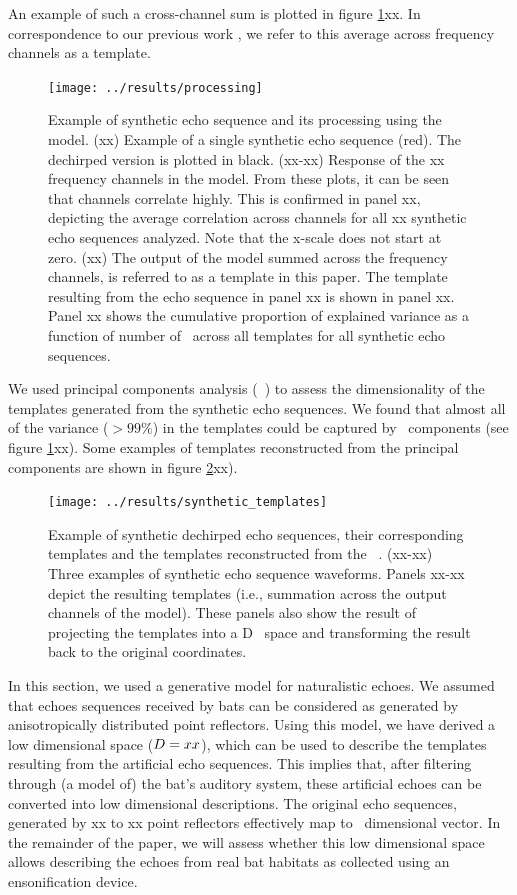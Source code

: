 \documentclass[preprint,5p]{elsarticle}
\begin{document}
An example of such a cross-channel sum is plotted in figure \ref{fig:processing}xx. In correspondence to our previous work \citep{Vanderelst2016}, we refer to this average across frequency channels as a template.

\begin{figure}[tb]
	\centering
	\texttt{[image: ../results/processing]}
	\caption{Example of synthetic echo sequence and its processing using the \citet{Wiegrebe2008} model. (xx) Example of a single synthetic echo sequence (red). The dechirped version is plotted in black. (xx-xx) Response of the xx frequency channels in the \citet{Wiegrebe2008} model. From these plots, it can be seen that channels correlate highly. This is confirmed in panel xx, depicting the average correlation across channels for all xx synthetic echo sequences analyzed. Note that the x-scale does not start at zero. (xx) The output of the \citet{Wiegrebe2008} model summed across the frequency channels, is referred to as a template in this paper. The template resulting from the echo sequence in panel xx is shown in panel xx. Panel xx shows the cumulative proportion of explained variance as a function of number of \pc\ across all templates for all synthetic echo sequences.}
	\label{fig:processing}
\end{figure}


We used principal components analysis (\PCA\ ) to assess the dimensionality of the templates generated from the synthetic echo sequences. We found that almost all of the variance ($> 99\%$) in the templates could be captured by \pca\ components (see figure \ref{fig:processing}xx). Some examples of templates reconstructed from the principal components are shown in figure \ref{fig:synthetictemplates}xx).

\begin{figure}[tb]
	\centering
	\texttt{[image: ../results/synthetic\_templates]}
	\caption{Example of synthetic dechirped echo sequences, their corresponding templates and the templates reconstructed from the \pca\ \pcs. (xx-xx) Three examples of synthetic echo sequence waveforms. Panels xx-xx depict the resulting templates (i.e., summation across the output channels of the \citet{Wiegrebe2008} model). These panels also show the result of projecting the templates into a \pca D \pc\ space and transforming the result back to the original coordinates.}
	\label{fig:synthetictemplates}
\end{figure}

In this section, we  used a generative model for naturalistic echoes. We assumed that echoes sequences received by bats can be considered as generated by anisotropically distributed point reflectors. Using this model, we have derived a low dimensional space ($D = xx$), which can be used to describe the templates resulting from the artificial echo sequences. This implies that, after filtering through (a model of) the bat's auditory system, these artificial echoes can be converted into low dimensional descriptions. The original echo sequences, generated by xx to xx point reflectors effectively map to \pca\ dimensional vector. In the remainder of the paper, we will assess whether this low dimensional space allows describing the echoes from real bat habitats as collected using an ensonification device.
\end{document}

